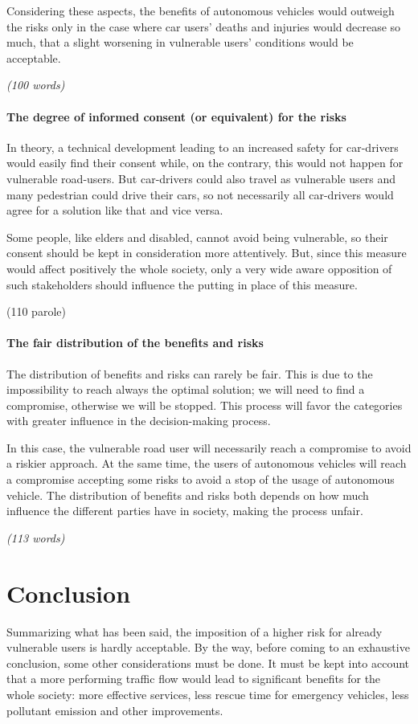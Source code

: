 Considering these aspects, the benefits of autonomous vehicles would outweigh the risks only in the case where car users’ deaths and injuries would decrease so much, that a slight worsening in vulnerable users’ conditions would be acceptable.

\emph{(100 words)}
\newpage
\paragraph{The degree of informed consent (or equivalent) for the risks}
In theory, a technical development leading to an increased safety for car-drivers would easily find their consent while, on the contrary, this would not happen for vulnerable road-users. But car-drivers could also travel as vulnerable users and many pedestrian could drive their cars, so not necessarily all car-drivers would agree for a solution like that and vice versa.

Some people, like elders and disabled, cannot avoid being vulnerable, so their consent should be kept in consideration more attentively. But, since this measure would affect positively the whole society, only a very wide aware opposition of such stakeholders should influence the putting in place of this measure.

(110 parole)

\paragraph{The fair distribution of the benefits and risks}
The distribution of benefits and risks can rarely be fair. This is due to the impossibility to reach always the optimal solution; we will need to find a compromise, otherwise we will be stopped. This process will favor the categories with greater influence in the decision-making process.

In this case, the vulnerable road user will necessarily reach a compromise to avoid a riskier approach. At the same time, the users of autonomous vehicles will reach a compromise accepting some risks to avoid a stop of the usage of autonomous vehicle. The distribution of benefits and risks both depends on how much influence the different parties have in society, making the process unfair.

\emph{(113 words)}

\section{Conclusion}
Summarizing what has been said, the imposition of a higher risk for already vulnerable users is hardly acceptable. By the way, before coming to an exhaustive conclusion, some other considerations must be done. It must be kept into account that a more performing traffic flow would lead to significant benefits for the whole society: more effective services, less rescue time for emergency vehicles, less pollutant emission and other improvements.

